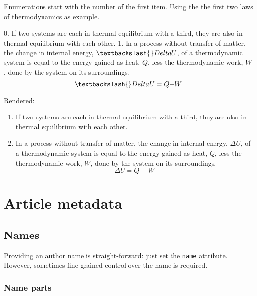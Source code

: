 \documentclass[
]{article}
\newenvironment{Shaded}{}{}
\newcommand{\NormalTok}[1]{#1}
\newcommand{\SpecialStringTok}[1]{\textcolor[rgb]{0.73,0.40,0.53}{#1}}
\providecommand{\tightlist}{%
  \setlength{\itemsep}{0pt}\setlength{\parskip}{0pt}}
\begin{document}
Enumerations start with the number of the first item. Using the the
first two
\href{https://en.wikipedia.org/wiki/Laws_of_thermodynamics}{laws of
thermodynamics} as example.

\begin{Shaded}
\begin{Highlighting}[]
\SpecialStringTok{0. }\NormalTok{If two systems are each in thermal equilibrium with a third, they are}
\NormalTok{   also in thermal equilibrium with each other.}
\SpecialStringTok{1. }\NormalTok{In a process without transfer of matter, the change in internal}
\NormalTok{   energy, $\textbackslash{}Delta U$, of a thermodynamic system is equal to the energy}
\NormalTok{   gained as heat, $Q$, less the thermodynamic work, $W$, done by the}
\NormalTok{   system on its surroundings. $$\textbackslash{}Delta U = Q {-} W$$}
\end{Highlighting}
\end{Shaded}

Rendered:

\begin{enumerate}
\def\labelenumi{\arabic{enumi}.}
\setcounter{enumi}{-1}
\tightlist
\item
  If two systems are each in thermal equilibrium with a third, they are
  also in thermal equilibrium with each other.
\item
  In a process without transfer of matter, the change in internal
  energy, \(\Delta U\), of a thermodynamic system is equal to the energy
  gained as heat, \(Q\), less the thermodynamic work, \(W\), done by the
  system on its surroundings. \[\Delta U = Q - W\]
\end{enumerate}

\hypertarget{article-metadata}{%
\section{Article metadata}\label{article-metadata}}

\hypertarget{names}{%
\subsection{Names}\label{names}}

Providing an author name is straight-forward: just set the \texttt{name}
attribute. However, sometimes fine-grained control over the name is
required.

\hypertarget{name-parts}{%
\subsubsection{Name parts}\label{name-parts}}
\end{document}
